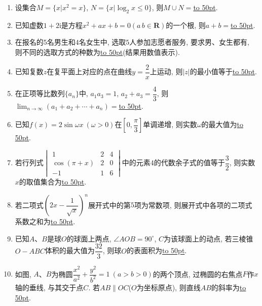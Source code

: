 \documentclass[10pt,a4paper]{article}
\newcommand{\blank}[1]{\underline{\hbox to #1pt{}}}
\begin{document}
\begin{enumerate}[1.]
\item 设集合$M=\{x|x^2=x\}$, $N=\{x|\log_2 x\le 0\}$, 则$M\cup N=$\blank{50}.
\item 已知虚数$1+2\mathrm{i}$是方程$x^2+ax+b=0 (a\,b\in \mathbf{R})$的一个根, 则$a+b=$\blank{50}.
\item 在报名的$5$名男生和$4$名女生中, 选取$5$人参加志愿者服务, 要求男、女生都有, 则不同的选取方式的种数为\blank{50}(结果用数值表示).
\item 已知复数$z$在复平面上对应的点在曲线$y=\dfrac 2 x$上运动, 则$|z|$的最小值等于\blank{50}.
\item 在正项等比数列$\{a_n\}$中, $a_1a_3=1$, $a_2+a_3=\dfrac43$, 则$\displaystyle\lim_{n\to\infty}(a_1+a_2+\cdots +a_n)=$\blank{50}.
\item 已知$f(x)=2 \sin \omega x\ (\omega >0)$在$[0,\dfrac\pi 3]$单调递增, 则实数$\omega$的最大值为\blank{50}.
\item 若行列式$\begin{vmatrix}   1 & 2 & 4 \\   \cos (\pi +x) & 2 & 0 \\   -1 & 1 & 6 \end{vmatrix}$中的元素$4$的代数余子式的值等于$\dfrac32$, 则实数$x$的取值集合为\blank{50}.
\item 若二项式$(2x-\dfrac1{\sqrt x})^n$展开式中的第$5$项为常数项, 则展开式中各项的二项式系数之和为\blank{50}. 
\item 已知$A$、$B$是球$O$的球面上两点, $\angle AOB=90^\circ$, $C$为该球面上的动点, 若三棱锥$O-ABC$体积的最大值为$\dfrac{32}{3}$, 则球$O$的表面积为\blank{50}.
\begin{center}
\end{center}
\item 如图, $A$、$B$为椭圆$\dfrac{x^2}{a^2}+\dfrac{y^2}{b^2}=1 \ (a>b>0)$的两个顶点, 过椭圆的右焦点$F$作$x$轴的垂线, 与其交于点$C$. 若$AB\parallel OC$($O$为坐标原点), 则直线$AB$的斜率为\blank{50}. 
\begin{center}

\end{center}
\end{enumerate}
\end{document}
